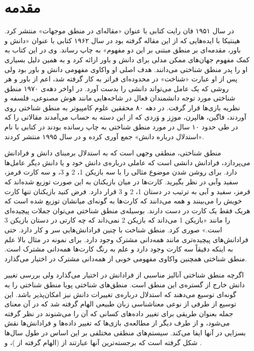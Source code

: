 \clearpage
{}
{}
\chapter*{مقدمه}

در سال ۱۹۵۱ فان رایت کتابی با عنوان «مقاله‌ای در منطق موجهات» \citep{Wright1951} منتشر کرد. هینتیکا با ایده‌هایی که از این مقاله گرفته بود در سال ۱۹۶۲ کتابی با عنوان «دانش و باور، مقدمه‌ای بر منطق مبتنی بر این دو مفهوم» \citep{Hintikka1962} به چاپ رساند. وی در این کتاب به کمک مفهوم جهان‌های ممکن مدلی برای دانش و باور ارائه کرد و به همین دلیل بسیاری او را پدر منطق شناختی می‌دانند. هدف اصلی او واکاوی مفهومی دانش و باور بود ولی پس از او عبارت «شناخت» در محدوده‌ای فراتر به کار گرفته شد، اعم از باور و هر روشی که یک عامل می‌تواند دانشی را بدست آورد. در اواخر دهه‌ی ۱۹۷۰ منطق شناختی مورد توجه دانشمندان فعال در شاخه‌هایی مانند هوش مصنوعی، فلسفه و نظریه بازی‌ها قرار گرفت.
در دهه ۸۰ محققین علوم کامپیوتر به منطق شناختی روی آوردند، فاگین، هالپرن، موزِز و وَردی که از این دسته به حساب می‌آمدند مقالاتی را که در طی حدود ۱۰ سال در مورد منطق شناختی به چاپ رسانده بودند در کتابی با نام «استدلال درباره دانش» \citep{RAKFagin1995} جمع آوری کرده و در سال ۱۹۹۵ منتشر کردند.

منطق شناختی، منطقی وجهی است که به استدلال برمبنای دانش و فرادانش می‌پردازد، فرادانش دانشی است که عاملی درباره‌ی دانش خود و یا دانش دیگر عامل‌ها دارد. برای روشن شدن موضوع مثالی را با سه بازیکن 1، 2 و 3، و سه کارت قرمز، سفید وآبی در نظر بگیرید. کارت‌ها در میان بازیکنان به این صورت توزیع شده‌اند که قرمز، سفید و آبی به ترتیب در دستان 1، 2 و 3 قرار دارد. فرض کنید بازیکنان تنها کارت خویش را می‌بینند و همه می‌دانند که کارت‌ها به گونه‌ای میانشان توزبع شده است که هریک فقط یک کارت در دست دارند.  بوسیله‌ی منطق شناختی می‌توان جملات پیچیده‌ای را مانند «بازیکن 1 می‌داند که بازیکن 2 نمی‌داند که چه کارتی در دستان بازیکن 3 است.» صوری کرد. منطق شناخت با چنین فرادانش‌هایی سر و کار دارد. حتی فرادانش‌های پیچیده‌تری مانند همه‌دانی مشترک وجود دارد. برای نمونه در مثال بالا علم به اینکه دقیقاً سه کارت وجود دارد و علم به رنگ کارت‌ها همه‌دانی مشترک است. منطق شناختی همچنین واکاوی مفهومی خوبی از همه‌دانی مشترک در اختیار می‌گذارد.

اگرچه منطق شناختی آنالیز مناسبی از فرادانش در اختیار می‌گذارد ولی بررسی تغییر دانش خارج از گستره‌ی این منطق است. منطق‌های شناختی پویا منطق‌ شناختی را به گونه‌ای توسیع می‌دهند که استدلال درباره‌ی تغییرات دانش نیز امکان‌پذیر باشد. این توسیع از طرفی از نوعی معناشناسی زبان طبیعی الهام گرفته شد که در آن معنای جمله بعنوان طریقی برای تغییر داده‌های کسانی که آن را می‌شنوند در نظر گرفته می‌شود، و از طرف دیگر از مطالعه‌ی بازی‌ها که تغییر داده‌ها و فرادانش‌ها نقش بسزایی در آنها ایفا می‌کند. سیستم‌های منطقی مختلفی بر این اساس در طول سال‌ها شکل گرفته است که برجسته‌ترین آنها عبارتند از \citep{Gerbrandy1997} (الهام گرفته از \citep{Veltman1996})، \citep{Batlag1998} و  \citep{Cate2002}.

